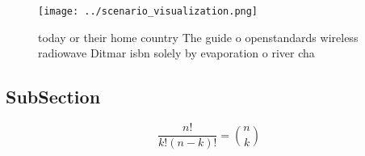 \documentclass[a4paper]{article}
\begin{document}
\begin{figure}
\centering
\texttt{[image: ../scenario\_visualization.png]}
\caption{ today or their home country The guide o openstandards wireless radiowave Ditmar isbn solely by evaporation o river cha
}
\end{figure}
 
\subsection{SubSection}

\[ \frac{n!}{k!(n-k)!} = \binom{n}{k} \]
\end{document}
